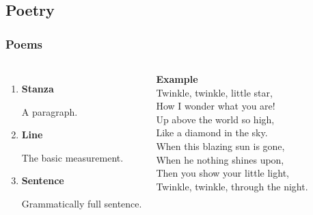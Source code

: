 \documentclass{beamer}
\begin{document}
\subsection{Poetry}
\begin{frame}
\frametitle{Poems}
\begin{columns}[c] %

\begin{enumerate}
\item \textbf{Stanza}

A paragraph.
\item \textbf{Line}

The basic measurement.
\item \textbf{Sentence}

Grammatically full sentence.
\end{enumerate}

\textbf{Example}\\
Twinkle, twinkle, little star,\\
How I wonder what you are!\\
Up above the world so high,\\
Like a diamond in the sky.\\
\vspace{2ex}
When this blazing sun is gone,\\
When he nothing shines upon,\\
Then you show your little light,\\
Twinkle, twinkle, through the night.
\end{columns}
\end{frame}
\end{document}
